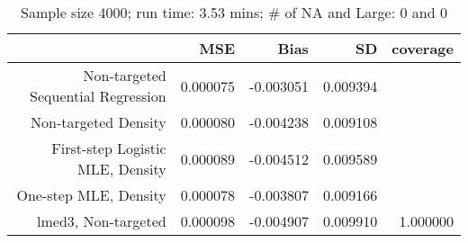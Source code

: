 \begin{table}[ht]
\centering
\caption{Sample size 4000; run time: 3.53 mins; # of NA and Large:  0 and 0} 
\begin{tabular}{rrrrr}
  \hline
 & MSE & Bias & SD & coverage \\ 
  \hline
Non-targeted Sequential Regression & 0.000075 & -0.003051 & 0.009394 &  \\ 
  Non-targeted Density & 0.000080 & -0.004238 & 0.009108 &  \\ 
  First-step Logistic MLE, Density & 0.000089 & -0.004512 & 0.009589 &  \\ 
  One-step MLE, Density & 0.000078 & -0.003807 & 0.009166 &  \\ 
  lmed3, Non-targeted & 0.000098 & -0.004907 & 0.009910 & 1.000000 \\ 
   \hline
\end{tabular}
\end{table}
